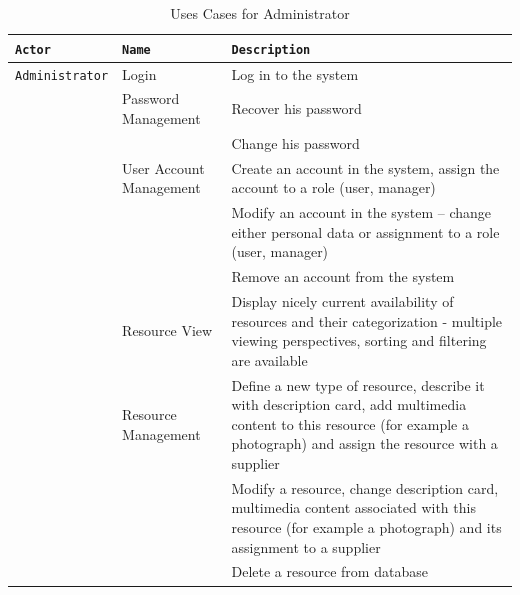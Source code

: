 \documentclass[a4paper,11pt,twoside]{report}
\theoremstyle{definition}
\begin{document}
\begin{longtable}{|p{3cm}|p{3cm}|p{10cm}|}
\caption[Uses Cases for Administrator]{Uses Cases for Administrator}
\label{Uses Cases Administrator}
\tabularnewline

\hline
\texttt{Actor} & \texttt{Name} & \texttt{Description} \\ \hline
\texttt{Administrator} & Login & Log in to the system\\  \cline{2-3}
\texttt{} & Password Management & Recover his password\\  \cline{3-3}
\texttt{} & & Change his password\\ \cline{2-3}

\texttt{} & User Account Management & Create an account in the system, assign the account to a role (user, manager)\\  \cline{3-3}
\texttt{} & & Modify an account in the system – change either personal data or assignment to a role (user, manager)\\ \cline{3-3}
\texttt{} & & Remove an account from the system\\ \cline{2-3}
\texttt{} & Resource View & Display nicely current availability of resources and their categorization - multiple viewing perspectives, sorting and filtering are available\\ \cline{2-3}
\texttt{} & Resource Management & Define a new type of resource, describe it with description card, add multimedia content to this resource (for example a photograph) and assign the resource with a supplier\\ \cline{3-3}
\texttt{} & & Modify a resource, change description card, multimedia content associated with this resource (for example a photograph) and its assignment to a supplier\\ \cline{3-3}
\texttt{} & & Delete a resource from database\\ \cline{2-3}


\end{longtable}
\end{document}
